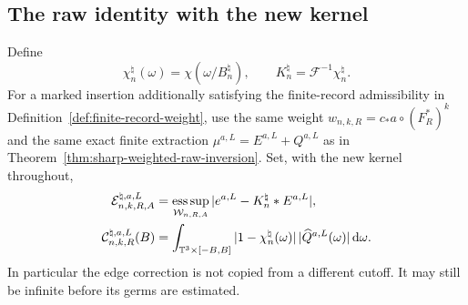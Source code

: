\subsection{The raw identity with the new kernel}
Define
\[
 \chi_n^\natural(\omega)=\chi(\omega/B_n^\natural),\qquad
 K_n^\natural=\mathcal F^{-1}\chi_n^\natural.
\]
For a marked insertion additionally satisfying the finite-record
admissibility in Definition~\ref{def:finite-record-weight}, use the
same weight $w_{n,k,R}=c_*a\circ(F_R^*)^k$ and the same exact finite
extraction $\mu^{a,L}=E^{a,L}+Q^{a,L}$ as in
Theorem~\ref{thm:sharp-weighted-raw-inversion}. Set, with the new
kernel throughout,
\begin{align}
 \mathcal E^{\natural,a,L}_{n,k,R,A}
 &=\mathop{\rm ess\,sup}_{\mathcal W_{n,R,A}}
                 |e^{a,L}-K_n^\natural*E^{a,L}|,\notag\\
 \mathcal C^{\natural,a,L}_{n,k,R}(B)
 &=\int_{\T^3\times[-B,B]}
       |1-\chi_n^\natural(\omega)|\,|\widehat Q^{a,L}(\omega)|\dd\omega.
 \label{eq:rate-preserving-raw-terms}
\end{align}
In particular the edge correction is not copied from a different
cutoff. It may still be infinite before its germs are estimated.

